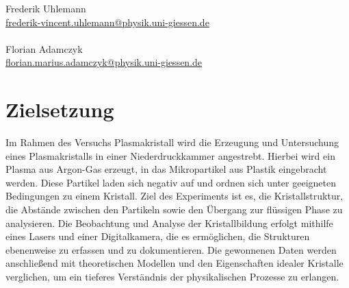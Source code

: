 \documentclass[12pt,a4paper,ngerman]{article}
\begin{document}
\begin{titlepage}
\begin{minipage}{0.49\textwidth}
\begin{flushright}
				\large{Frederik Uhlemann}\\
				\small{\href{mailto:frederik-vincent.uhlemann@physik.uni-giessen.de}{frederik-vincent.uhlemann@physik.uni-giessen.de}\\~\\
				}
				\large{Florian Adamczyk} \\
				\small{\href{mailto:florian.marius.adamczyk@physik.uni-giessen.de}{florian.marius.adamczyk@physik.uni-giessen.de}\\
			}
		\end{flushright}
	\end{minipage}
	
	\end{titlepage}
	
\setcounter{secnumdepth}{3}
\setcounter{tocdepth}{3}


	
\section*{Zielsetzung}
Im Rahmen des Versuchs \glqq{}Plasmakristall\grqq{} wird die Erzeugung und Untersuchung eines Plasmakristalls in einer Niederdruckkammer angestrebt. Hierbei wird ein Plasma aus Argon-Gas erzeugt, in das Mikropartikel aus Plastik eingebracht werden. Diese Partikel laden sich negativ auf und ordnen sich unter geeigneten Bedingungen zu einem Kristall. Ziel des Experiments ist es, die Kristallstruktur, die Abstände zwischen den Partikeln sowie den Übergang zur flüssigen Phase zu analysieren. Die Beobachtung und Analyse der Kristallbildung erfolgt mithilfe eines Lasers und einer Digitalkamera, die es ermöglichen, die Strukturen ebenenweise zu erfassen und zu dokumentieren. Die gewonnenen Daten werden anschließend mit theoretischen Modellen und den Eigenschaften idealer Kristalle verglichen, um ein tieferes Verständnis der physikalischen Prozesse zu erlangen.

\end{document}
